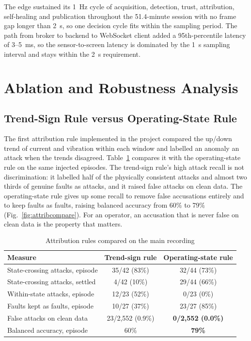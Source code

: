 \documentclass[11pt,a4paper]{article}
\begin{document}
The edge sustained its 1~Hz cycle of acquisition, detection, trust, attribution, self-healing and publication throughout the 51.4-minute session with no frame gap longer than 2~s, so one decision cycle fits within the sampling period. The path from broker to backend to WebSocket client added a 95th-percentile latency of 3--5~ms, so the sensor-to-screen latency is dominated by the 1~s sampling interval and stays within the 2~s requirement.

\section{Ablation and Robustness Analysis}
\label{sec:ablation}

\subsection{Trend-Sign Rule versus Operating-State Rule}

The first attribution rule implemented in the project compared the up/down trend of current and vibration within each window and labelled an anomaly an attack when the trends disagreed. Table~\ref{tab:ablate} compares it with the operating-state rule on the same injected episodes. The trend-sign rule's high attack recall is not discrimination: it labelled half of the physically consistent attacks and almost two thirds of genuine faults as attacks, and it raised false attacks on clean data. The operating-state rule gives up some recall to remove false accusations entirely and to keep faults as faults, raising balanced accuracy from 60\% to 79\% (Fig.~\ref{fig:attribcompare}). For an operator, an accusation that is never false on clean data is the property that matters.

\begin{table}[H]
\centering
\caption{Attribution rules compared on the main recording}
\label{tab:ablate}
\small
\begin{tabularx}{\textwidth}{@{}X c c@{}}
\toprule
\textbf{Measure} & \textbf{Trend-sign rule} & \textbf{Operating-state rule} \\
\midrule
State-crossing attacks, episode & 35/42 (83\%) & 32/44 (73\%) \\
State-crossing attacks, settled & 4/42 (10\%) & 29/44 (66\%) \\
Within-state attacks, episode & 12/23 (52\%) & 0/23 (0\%) \\
Faults kept as faults, episode & 10/27 (37\%) & 23/27 (85\%) \\
False attacks on clean data & 23/2,552 (0.9\%) & \textbf{0/2,552 (0.0\%)} \\
Balanced accuracy, episode & 60\% & \textbf{79\%} \\
\bottomrule
\end{tabularx}
\end{table}
\end{document}
